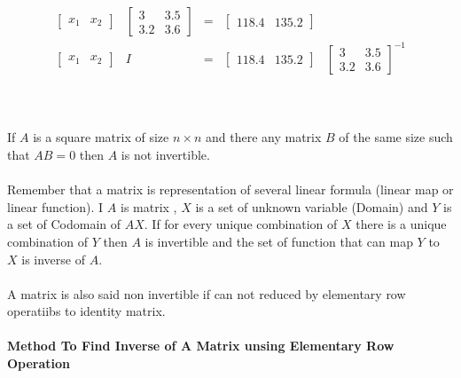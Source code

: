 \documentclass[a4paper, 12pt]{article}
\begin{document}
\[
{\begin{array}{ccccc}
\left[{\begin{array}{cc}
x_1 & x_2
\end{array}
}
\right] &
\left[{\begin{array}{cc}
3 & 3.5  \\
3.2 & 3.6
\end{array}
}
\right] &
=       &
\left[{\begin{array}{cc}
118.4 & 135.2
\end{array}
}
\right] &
\\
\left[{\begin{array}{cc}
x_1 & x_2
\end{array}
}
\right]  &
I &
= &
\left[{\begin{array}{cc}
118.4 & 135.2
\end{array}
}
\right] &
\left[{\begin{array}{cc}
3 & 3.5  \\
3.2 & 3.6
\end{array}
}
\right] ^{-1} 
\end{array}}
\] 
\\
\\
\\
If $A$ is a square matrix of size $n \times n$ and there any matrix $B$ of the same size such that  
$A B = 0$ then $A$ is not invertible.
\\
\\
Remember that a matrix is representation of several linear formula (linear map or linear function).
I $A$ is matrix , $X$ is a set of unknown variable (Domain) and $Y$ is a set of Codomain of
$AX$. If for every unique combination of $X$ there is a unique combination of $Y$ then $A$
is invertible and the set of function that can map $Y$ to $X$ is inverse of $A$.
\\
\\
A matrix is also said non invertible if can not reduced by elementary row operatiibs to identity matrix.
\\
\\
\textbf{Method To Find Inverse of A Matrix unsing Elementary Row Operation}
\end{document}
